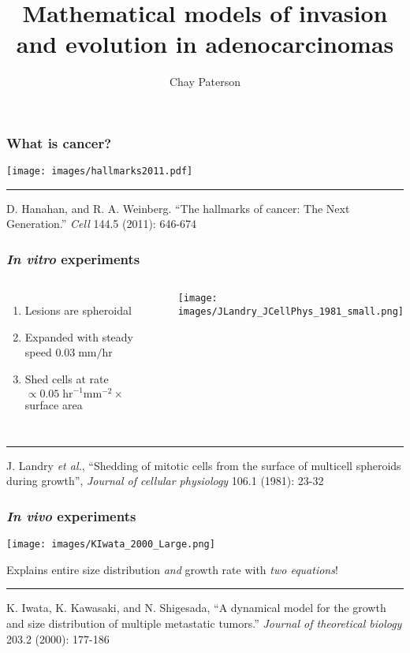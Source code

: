 \documentclass{beamer}
\title{Mathematical models of invasion and evolution in adenocarcinomas}
\author{Chay Paterson}
\institute{University of Washington}
\date[\today]{}
\begin{document}
\frame{\titlepage}

\begin{frame}
\frametitle{What is cancer?}


\begin{center}
\texttt{[image: images/hallmarks2011.pdf]}
\end{center}

\hrule
\;

\tiny{D. Hanahan, and R. A. Weinberg. ``The hallmarks of cancer: The Next Generation.'' \emph{Cell}
144.5 (2011): 646-674}
\end{frame}

\begin{frame}
\frametitle{\emph{In vitro} experiments}
\begin{columns}[c]
    \begin{enumerate}
        \item Lesions are spheroidal
        \item Expanded with steady speed $0.03\; \mathrm{mm}/\mathrm{hr}$
        \item Shed cells at rate $\propto 0.05\;\mathrm{hr}^{-1}
        \mathrm{mm}^{-2} \times $ surface area
    \end{enumerate}
    
    \texttt{[image: images/JLandry\_JCellPhys\_1981\_small.png]}
\end{columns}

 \;
 \hrule
 \;
\tiny{J. Landry \emph{et al.}, ``Shedding of mitotic cells from the surface of multicell spheroids
during growth'', \emph{Journal of cellular physiology} 106.1 (1981): 23-32}
\end{frame}

\begin{frame}
\frametitle{\emph{In vivo} experiments}

\begin{center}
\texttt{[image: images/KIwata\_2000\_Large.png]}
\;

\small{Explains entire size distribution \emph{and} growth rate with \emph{two
equations}!}
\end{center}
\;
\hrule
\;

\tiny{K. Iwata, K. Kawasaki, and N. Shigesada, ``A dynamical model for the growth
and size distribution of multiple metastatic tumors.'' \emph{Journal of theoretical
biology} 203.2 (2000): 177-186}
\end{frame}
\end{document}
